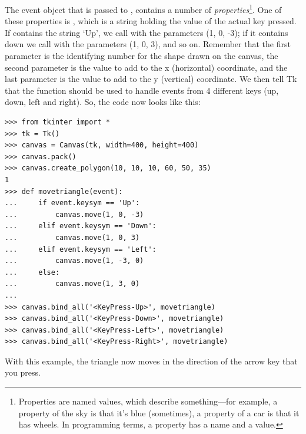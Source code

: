 The event object that is passed to , contains a number of \emph{properties}\footnote{Properties are named values, which describe something---for example, a property of the sky is that it's blue (sometimes), a property of a car is that it has wheels. In programming terms, a property has a name and a value.}.  One of these properties is , which is a string holding the value of the actual key pressed.  If  contains the string `Up', we call  with the parameters (1, 0, -3); if it contains down we call with the parameters (1, 0, 3), and so on.  Remember that the first parameter is the identifying number for the shape drawn on the canvas, the second parameter is the value to add to the x (horizontal) coordinate, and the last parameter is the value to add to the y (vertical) coordinate. We then tell Tk that the  function should be used to handle events from 4 different keys (up, down, left and right).  So, the code now looks like this:

\begin{listingignore}
\begin{verbatim}
>>> from tkinter import *
>>> tk = Tk()
>>> canvas = Canvas(tk, width=400, height=400)
>>> canvas.pack()
>>> canvas.create_polygon(10, 10, 10, 60, 50, 35)
1 
>>> def movetriangle(event):
...     if event.keysym == 'Up':
...         canvas.move(1, 0, -3)
...     elif event.keysym == 'Down':
...         canvas.move(1, 0, 3)
...     elif event.keysym == 'Left':
...         canvas.move(1, -3, 0)
...     else:
...         canvas.move(1, 3, 0)
... 
>>> canvas.bind_all('<KeyPress-Up>', movetriangle)
>>> canvas.bind_all('<KeyPress-Down>', movetriangle)
>>> canvas.bind_all('<KeyPress-Left>', movetriangle)
>>> canvas.bind_all('<KeyPress-Right>', movetriangle)
\end{verbatim}
\end{listingignore}

\noindent
With this example, the triangle now moves in the direction of the arrow key that you press.

\newpage
